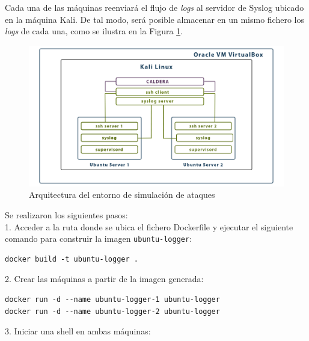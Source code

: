 Cada una de las máquinas reenviará el flujo de \textit{logs} al servidor de Syslog ubicado en la máquina Kali. De tal modo, será posible almacenar en un mismo fichero los \textit{logs} de cada una, como se ilustra en la Figura \ref{fig:entorno-ataques}.

\vspace{2mm}

\begin{figure}[H]
    \centering
    \includegraphics[width=1\linewidth]{imagenes/Enviromentv2.png}
    \caption{Arquitectura del entorno de simulación de ataques}
    \label{fig:entorno-ataques}
\end{figure}

\newpage

Se realizaron los siguientes pasos: \\

1. Acceder a la ruta donde se ubica el fichero Dockerfile y ejecutar el siguiente comando para construir la imagen \texttt{ubuntu-logger}:

\begin{mdframed}
\footnotesize
 \begin{verbatim}
docker build -t ubuntu-logger .
\end{verbatim}   
\end{mdframed}

2. Crear las máquinas a partir de la imagen generada:

\begin{mdframed}
\footnotesize
\begin{verbatim}
docker run -d --name ubuntu-logger-1 ubuntu-logger
docker run -d --name ubuntu-logger-2 ubuntu-logger
\end{verbatim}
\end{mdframed}

3. Iniciar una shell en ambas máquinas:

